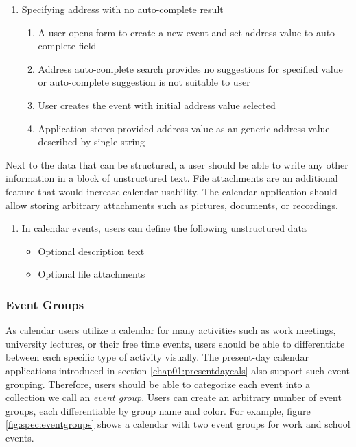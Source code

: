 \begin{enumerate}[label=\color{usecasecolor}\textbf{U{\arabic*}}]
    \item \label{app:uc:event1} Specifying address with no auto-complete result
        \begin{enumerate}
            \item A user opens form to create a new event and set address value to auto-complete field
            \item Address auto-complete search provides no suggestions for specified value or auto-complete suggestion is not suitable to user
            \item User creates the event with initial address value selected
            \item Application stores provided address value as an generic address value described by single string
        \end{enumerate}
\end{enumerate}


Next to the data that can be structured, a user should be able to write any other information in a block of unstructured text. File attachments are an additional feature that would increase calendar usability. The calendar application should allow storing arbitrary attachments such as pictures, documents, or recordings.

\begin{enumerate}[label=\color{reqcolor}\textbf{R{\arabic*}}, resume]
    \item \label{app:req:events3} In calendar events, users can define the following unstructured data
        \begin{itemize}
            \item Optional description text
            \item Optional file attachments
        \end{itemize}
\end{enumerate}



\subsubsection*{Event Groups}

As calendar users utilize a calendar for many activities such as work meetings, university lectures, or their free time events, users should be able to differentiate between each specific type of activity visually. The present-day calendar applications introduced in section \ref{chap01:presentdaycals} also support such event grouping. Therefore, users should be able to categorize each event into a collection we call an \textit{event group}. Users can create an arbitrary number of event groups, each differentiable by group name and color. For example, figure \ref{fig:spec:eventgroups} shows a calendar with two event groups for work and school events.

